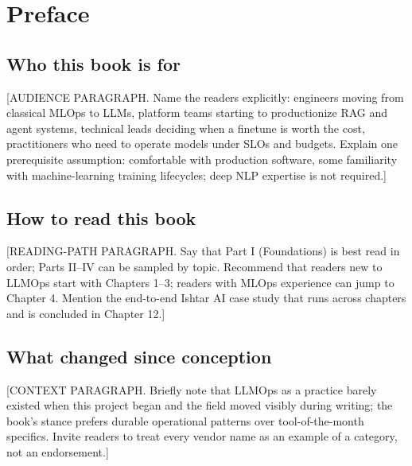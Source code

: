 \chapter*{Preface}


\section*{Who this book is for}

[AUDIENCE PARAGRAPH. Name the readers explicitly: engineers moving
from classical MLOps to LLMs, platform teams starting to productionize
RAG and agent systems, technical leads deciding when a finetune is
worth the cost, practitioners who need to operate models under SLOs
and budgets. Explain one prerequisite assumption: comfortable with
production software, some familiarity with machine-learning training
lifecycles; deep NLP expertise is not required.]

\section*{How to read this book}

[READING-PATH PARAGRAPH. Say that Part I (Foundations) is best read
in order; Parts II--IV can be sampled by topic. Recommend that readers
new to LLMOps start with Chapters 1--3; readers with MLOps experience
can jump to Chapter 4. Mention the end-to-end Ishtar AI case study
that runs across chapters and is concluded in Chapter 12.]

\section*{What changed since conception}

[CONTEXT PARAGRAPH. Briefly note that LLMOps as a practice barely
existed when this project began and the field moved visibly during
writing; the book's stance prefers durable operational patterns over
tool-of-the-month specifics. Invite readers to treat every vendor
name as an example of a category, not an endorsement.]

